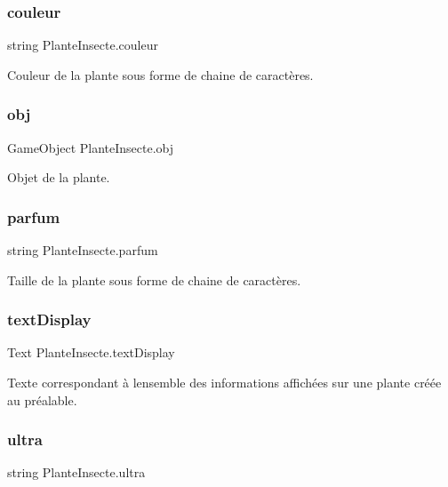 \subsubsection{\texorpdfstring{couleur}{couleur}}
{\footnotesize\ttfamily string Plante\+Insecte.\+couleur}

Couleur de la plante sous forme de chaine de caractères. \mbox{\label{class_plante_insecte_a30b84ff54026e3dffb8df37d2380b622}} 
\subsubsection{\texorpdfstring{obj}{obj}}
{\footnotesize\ttfamily Game\+Object Plante\+Insecte.\+obj}

Objet de la plante. \mbox{\label{class_plante_insecte_ab0de41d3ee235eefb189fcc45def5f72}} 
\subsubsection{\texorpdfstring{parfum}{parfum}}
{\footnotesize\ttfamily string Plante\+Insecte.\+parfum}

Taille de la plante sous forme de chaine de caractères. \mbox{\label{class_plante_insecte_aa914c21b885c3fa13ac6890f6ed7e84c}} 
\subsubsection{\texorpdfstring{text\+Display}{textDisplay}}
{\footnotesize\ttfamily Text Plante\+Insecte.\+text\+Display}

Texte correspondant à l\textquotesingle{}ensemble des informations affichées sur une plante créée au préalable. \mbox{\label{class_plante_insecte_a3f8b8029bf7af2a07d7b6121c4fcc46b}} 
\subsubsection{\texorpdfstring{ultra}{ultra}}
{\footnotesize\ttfamily string Plante\+Insecte.\+ultra}

